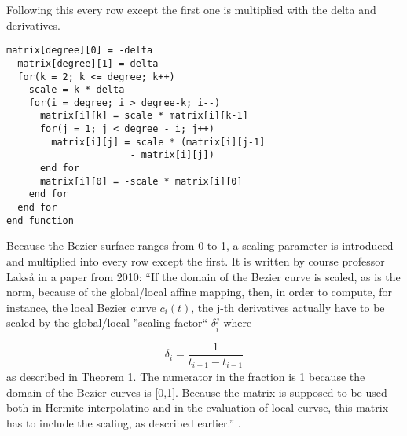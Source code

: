\documentclass[a4paper,11pt]{article}
\begin{document}
Following this every row except the first one is multiplied with the delta and derivatives.  

\label{fig:bezierEval2}
\begin{lstlisting}[frame=single, caption={Assigning the bottom half of the matrix}] 
  matrix[degree][0] = -delta
  matrix[degree][1] = delta
  for(k = 2; k <= degree; k++)
    scale = k * delta
    for(i = degree; i > degree-k; i--)
      matrix[i][k] = scale * matrix[i][k-1]
      for(j = 1; j < degree - i; j++)
        matrix[i][j] = scale * (matrix[i][j-1]
                      - matrix[i][j])
      end for
      matrix[i][0] = -scale * matrix[i][0]
    end for
  end for
end function
\end{lstlisting}

Because the Bezier surface ranges from 0 to 1, a scaling parameter is introduced and multiplied into every row except the first. It is written by course professor Lakså in a paper from 2010: ``If the domain of the Bezier curve is scaled, as is the norm, because of the global/local affine mapping, then, in order to compute, for instance, the local Bezier curve $c_{i}(t)$, the j-th derivatives actually have to be scaled by the global/local ''scaling factor`` $\delta_{i}^{j}$ where

\begin{equation}
 \delta_{i} = \frac{1}{t_{i+1}-t_{i-1}}
\end{equation}
as described in Theorem 1. The numerator in the fraction is 1 because the domain of the Bezier curves is [0,1]. Because the matrix is supposed to be used both in Hermite interpolatino and in the evaluation of local curvse, this matrix has to include the scaling, as described earlier.'' \cite{art_gmbf}.
\end{document}
